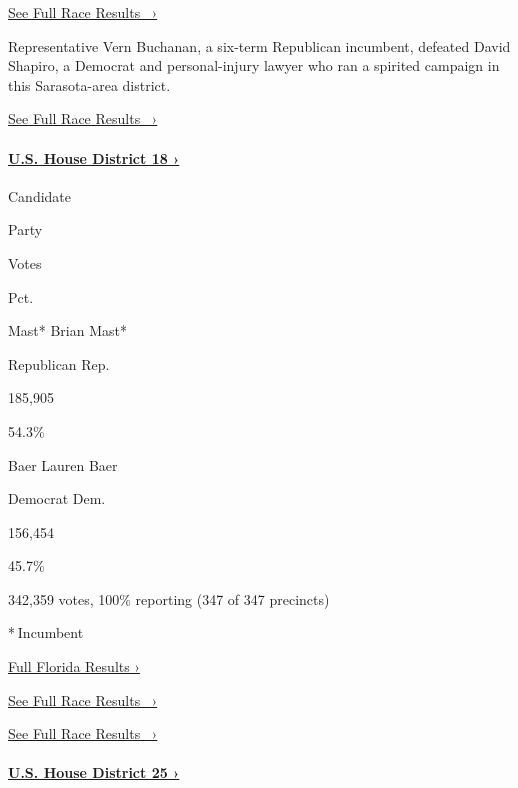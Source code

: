 \href{https://www.nytimes3xbfgragh.onion/elections/results/florida-house-district-16}{See
Full Race Results~ ›}

Representative Vern Buchanan, a six-term Republican incumbent, defeated
David Shapiro, a Democrat and personal-injury lawyer who ran a spirited
campaign in this Sarasota-area district.

\href{https://www.nytimes3xbfgragh.onion/elections/results/florida-house-district-16}{See
Full Race Results~ ›}

\hypertarget{us-house-district-18-}{%
\paragraph{\texorpdfstring{\href{https://www.nytimes3xbfgragh.onion/elections/results/florida-house-district-18}{U.S.
House District 18
›}}{U.S. House District 18 ›}}\label{us-house-district-18-}}

Candidate

Party

Votes

Pct.

 Mast* Brian Mast*

Republican Rep.

185,905

54.3\%

 Baer Lauren Baer

Democrat Dem.

156,454

45.7\%

342,359 votes, 100\% reporting (347 of 347 precincts)

* Incumbent

\href{https://www.nytimes3xbfgragh.onion/interactive/2018/11/06/us/elections/results-florida-elections.html}{Full
Florida Results ›}

\href{https://www.nytimes3xbfgragh.onion/elections/results/florida-house-district-18}{See
Full Race Results~ ›}

\href{https://www.nytimes3xbfgragh.onion/elections/results/florida-house-district-18}{See
Full Race Results~ ›}

\hypertarget{us-house-district-25-}{%
\paragraph{\texorpdfstring{\href{https://www.nytimes3xbfgragh.onion/elections/results/florida-house-district-25}{U.S.
House District 25
›}}{U.S. House District 25 ›}}\label{us-house-district-25-}}

